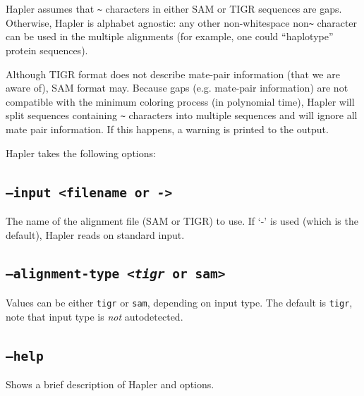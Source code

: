 \documentclass[11pt]{llncs}
\begin{document}
Hapler assumes that \verb=~= characters in either SAM or TIGR sequences are gaps. Otherwise, Hapler is alphabet agnostic: any other non-whitespace
non\verb=~= character can be used in the multiple alignments (for example, one could ``haplotype'' protein sequences). 

Although TIGR format does not describe mate-pair information (that we are aware of), SAM format may. Because gaps (e.g. mate-pair information) are 
not compatible with the minimum coloring process (in polynomial time), Hapler will split sequences containing \texttt{\~} characters into multiple
sequences and will ignore all mate pair information. If this happens, a warning is printed to the output. 


Hapler takes the following options:

\subsection{\texttt{--input <filename or \emph{-}>}}

The name of the alignment file (SAM or TIGR) to use. If `-' is used (which is the default), Hapler reads on standard input.

\subsection{\texttt{--alignment-type <\emph{tigr} or sam>}}

Values can be either \verb=tigr= or \verb=sam=, depending on input type. The default is \verb=tigr=, note that input type is \emph{not}
autodetected.



\subsection{\texttt{--help}}

Shows a brief description of Hapler and options.
\end{document}
